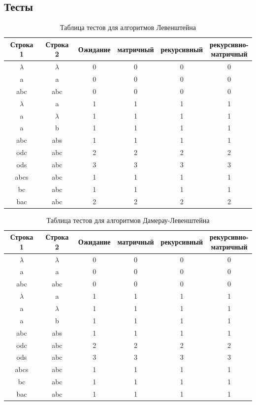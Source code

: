 \subsection{Тесты}
\begin{table}[H]
    \centering
    \begin{tabular}{|c|c|c|c|c|c|}
        \hline
        \textbf{Строка 1} & \textbf{Строка 2} & \textbf{Ожидание} & \textbf{матричный} & \textbf{рекурсивный} & \makecell{\textbf{рекурсивно-}\\\textbf{матричный}} \\
        \hline
        $\lambda$ & $\lambda$ & 0 & 0 & 0 & 0 \\
        a  & a  & 0 & 0 & 0 & 0 \\
        abc & abc & 0 & 0 & 0 & 0 \\
        $\lambda$  & a  & 1 & 1 & 1 & 1 \\
        a  & $\lambda$  & 1 & 1 & 1 & 1 \\
        a  & b  & 1 & 1 & 1 & 1 \\
        abc & abs & 1 & 1 & 1 & 1 \\
        odc & abc & 2 & 2 & 2 & 2 \\
        ods & abc & 3 & 3 & 3 & 3 \\
        abcs & abc & 1 & 1 & 1 & 1 \\
        bc & abc & 1 & 1 & 1 & 1 \\
        bac & abc & 2 & 2 & 2 & 2 \\
        \hline
    \end{tabular}
    \caption{Таблица тестов для алгоритмов Левенштейна}
\end{table}
\begin{table}[H]
    \centering
    \begin{tabular}{|c|c|c|c|c|c|}
        \hline
        \textbf{Строка 1} & \textbf{Строка 2} & \textbf{Ожидание} & \textbf{матричный} & \textbf{рекурсивный} & \makecell{\textbf{рекурсивно-}\\\textbf{матричный}} \\
        \hline
        $\lambda$ & $\lambda$ & 0 & 0 & 0 & 0 \\
        a  & a  & 0 & 0 & 0 & 0 \\
        abc & abc & 0 & 0 & 0 & 0 \\
        $\lambda$  & a  & 1 & 1 & 1 & 1 \\
        a  & $\lambda$  & 1 & 1 & 1 & 1 \\
        a  & b  & 1 & 1 & 1 & 1 \\
        abc & abs & 1 & 1 & 1 & 1 \\
        odc & abc & 2 & 2 & 2 & 2 \\
        ods & abc & 3 & 3 & 3 & 3 \\
        abcs & abc & 1 & 1 & 1 & 1 \\
        bc & abc & 1 & 1 & 1 & 1 \\
        bac & abc & 1 & 1 & 1 & 1 \\
        \hline
    \end{tabular}
    \caption{Таблица тестов для алгоритмов Дамерау-Левенштейна}
\end{table}
